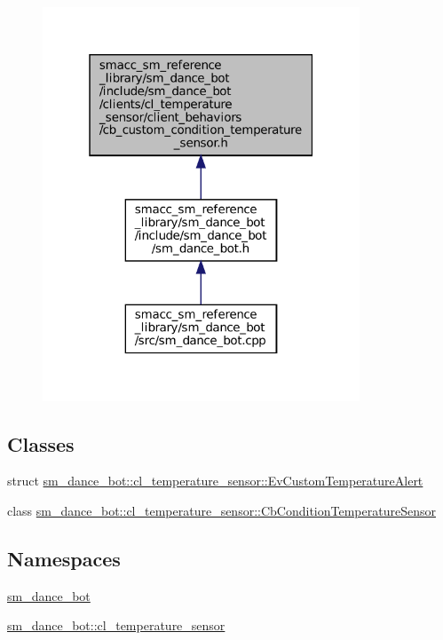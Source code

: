 \nopagebreak
\begin{figure}[H]
\begin{center}
\leavevmode
\includegraphics[width=268pt]{sm__dance__bot_2include_2sm__dance__bot_2clients_2cl__temperature__sensor_2client__behaviors_2cb33cbb8cf31b6d57a5be1b7188f32dfa8}
\end{center}
\end{figure}
\subsection*{Classes}
\begin{DoxyCompactItemize}
\item 
struct \hyperlink{structsm__dance__bot_1_1cl__temperature__sensor_1_1EvCustomTemperatureAlert}{sm\+\_\+dance\+\_\+bot\+::cl\+\_\+temperature\+\_\+sensor\+::\+Ev\+Custom\+Temperature\+Alert}
\item 
class \hyperlink{classsm__dance__bot_1_1cl__temperature__sensor_1_1CbConditionTemperatureSensor}{sm\+\_\+dance\+\_\+bot\+::cl\+\_\+temperature\+\_\+sensor\+::\+Cb\+Condition\+Temperature\+Sensor}
\end{DoxyCompactItemize}
\subsection*{Namespaces}
\begin{DoxyCompactItemize}
\item 
 \hyperlink{namespacesm__dance__bot}{sm\+\_\+dance\+\_\+bot}
\item 
 \hyperlink{namespacesm__dance__bot_1_1cl__temperature__sensor}{sm\+\_\+dance\+\_\+bot\+::cl\+\_\+temperature\+\_\+sensor}
\end{DoxyCompactItemize}
